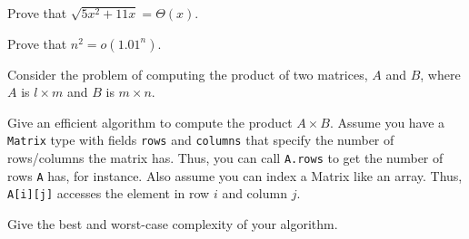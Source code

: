 \begin{pro}
Prove that $\sqrt{5x^2+11x}=\Theta(x)$.
\end{pro}

\begin{pro}
Prove that $n^2=o(1.01^n)$.
\end{pro}

\begin{pro}
Consider the problem of computing the product of two matrices, $A$ and $B$, where 
$A$ is $l\times m$ and $B$ is $m\times n$.
\begin{lenum}
\item
Give an efficient algorithm to compute the product $A\times B$.
Assume you have a \verb+Matrix+ type with fields \verb+rows+ and \verb+columns+
that specify the number of rows/columns the matrix has.  Thus, you can call
\verb+A.rows+ to get the number of rows \verb+A+ has, for instance.
Also assume you can index a Matrix like an array.  Thus, \verb+A[i][j]+ accesses
the element in row $i$ and column $j$.
\item
Give the best and worst-case complexity of your algorithm.
\end{lenum}
\end{pro}


